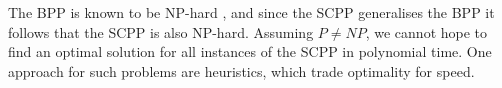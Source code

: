 \documentclass[authoryear]{elsarticle}
\begin{document}
\begin{comment}
\noindent A feasible solution for an instance of the SCPP is represented by the set $\mathcal{S} = \{S_1, S_2,\dotsc,S_k\}$ such that
\begin{subequations}
	\begin{alignat}{2}
	\bigcup\nolimits_{j=1}^{k} S_j &= \mathcal{I}, & \label{eqn:packall}\\[4pt]
	S_i \cap S_j &= \emptyset &\quad &\forall \hspace{1mm} i, j \in \{1,2,\dotsc,k\}, \hspace{1mm} i \neq j, \label{eqn:nooverlap} \\[4pt]
	A(S_j) = \sum\nolimits_{i=1}^{|S_j|}w_i &\leq W &\quad &\forall \hspace{1mm} S_j \in \mathcal{S}, \label{eqn:capacity} \\[4pt]
	\textup{\textbf{r}}(i) + \textup{\textbf{l}}(i+1) &\geq \tau &\quad &\forall \hspace{1mm} i \in \{1, 2,\dotsc,|S_j|-1\}, \hspace{1mm} \forall \hspace{1mm} S_j \in \mathcal{S}. \label{eqn:vscbin}
	\end{alignat}
\end{subequations}

\noindent An optimal solution for the SCPP is a solution consisting of the fewest number of bins required to feasibly pack all items in $\mathcal{I}$, thus the aim is to minimise $k$. Here, a bin $S_j \in \mathcal{F}$ if the total width of items in the bin does not exceed the bin's capacity \eqref{eqn:capacity} and the vicinal sum constraint is fulfilled \eqref{eqn:vscbin}.
\end{comment}

The BPP is known to be NP-hard \citep{garey1979}, and since the SCPP generalises the BPP it follows that the SCPP is also NP-hard. Assuming $P \neq NP$, we cannot hope to find an optimal solution for all instances of the SCPP in polynomial time. One approach for such problems are heuristics, which trade optimality for speed. 
\end{document}
